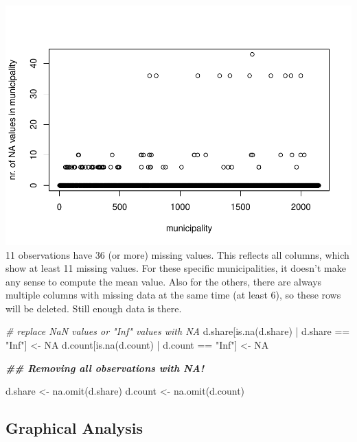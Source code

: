 \documentclass[
]{article}
\newenvironment{Shaded}{\begin{snugshade}}{\end{snugshade}}
\newcommand{\CommentTok}[1]{\textcolor[rgb]{0.56,0.35,0.01}{\textit{#1}}}
\newcommand{\ConstantTok}[1]{\textcolor[rgb]{0.00,0.00,0.00}{#1}}
\newcommand{\DocumentationTok}[1]{\textcolor[rgb]{0.56,0.35,0.01}{\textbf{\textit{#1}}}}
\newcommand{\FunctionTok}[1]{\textcolor[rgb]{0.00,0.00,0.00}{#1}}
\newcommand{\NormalTok}[1]{#1}
\newcommand{\OtherTok}[1]{\textcolor[rgb]{0.56,0.35,0.01}{#1}}
\newcommand{\SpecialCharTok}[1]{\textcolor[rgb]{0.00,0.00,0.00}{#1}}
\newcommand{\StringTok}[1]{\textcolor[rgb]{0.31,0.60,0.02}{#1}}
\begin{document}
\includegraphics{Influence_factors_files/figure-latex/1.05_Multiple_missing-1.pdf}
11 observations have 36 (or more) missing values. This reflects all
columns, which show at least 11 missing values. For these specific
municipalities, it doesn't make any sense to compute the mean value.
Also for the others, there are always multiple columns with missing data
at the same time (at least 6), so these rows will be deleted. Still
enough data is there.

\begin{Shaded}
\begin{Highlighting}[]
\CommentTok{\# replace NaN values or "Inf" values with NA}
\NormalTok{d.share[}\FunctionTok{is.na}\NormalTok{(d.share) }\SpecialCharTok{|}\NormalTok{ d.share }\SpecialCharTok{==} \StringTok{"Inf"}\NormalTok{] }\OtherTok{\textless{}{-}} \ConstantTok{NA}
\NormalTok{d.count[}\FunctionTok{is.na}\NormalTok{(d.count) }\SpecialCharTok{|}\NormalTok{ d.count }\SpecialCharTok{==} \StringTok{"Inf"}\NormalTok{] }\OtherTok{\textless{}{-}} \ConstantTok{NA}

\DocumentationTok{\#\# Removing all observations with NA!}

\NormalTok{d.share }\OtherTok{\textless{}{-}} \FunctionTok{na.omit}\NormalTok{(d.share)}
\NormalTok{d.count }\OtherTok{\textless{}{-}} \FunctionTok{na.omit}\NormalTok{(d.count)}
\end{Highlighting}
\end{Shaded}

\newpage

\hypertarget{graphical-analysis}{%
\subsection{Graphical Analysis}\label{graphical-analysis}}
\end{document}
